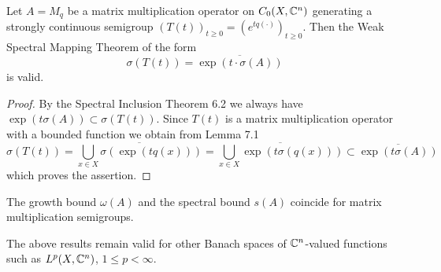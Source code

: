 \begin{theorem}\label{thm:a3-7.2}
Let $A = M_{q}$ be a matrix multiplication operator on $C_{0}(X,\mathbb{C}^{n})$ generating a strongly continuous semigroup $(T(t))_{t\geq 0} = (e^{tq(\cdot)})_{t\geq 0}$.
Then the Weak Spectral Mapping Theorem of the form
\begin{equation}\label{eq:a3-7.3}
\sigma(T(t)) = \overline{\exp(t\cdot\sigma(A))}
\end{equation}
is valid.
\end{theorem}
\begin{proof}
By the Spectral Inclusion Theorem 6.2 we always have $\exp(t\sigma(A)) \subset \sigma(T(t))$.
Since $T(t)$ is a matrix multiplication operator with a bounded function we obtain from Lemma 7.1
\[
\sigma(T(t)) = \overline{\bigcup_{x\in X} \sigma(\exp(tq(x)))} = \overline{\bigcup_{x\in X} \exp(t\sigma(q(x)))} \subset \overline{\exp(t\sigma(A))}
\]
which proves the assertion.
\end{proof}
\begin{corollary}\label{cor:a3-7.3}
The growth bound $\omega(A)$ and the spectral bound $s(A)$ coincide for matrix multiplication semigroups.
\end{corollary}
The above results remain valid for other Banach spaces of $\mathbb{C}^{n}$-valued functions such as $L^{p}(X,\mathbb{C}^{n})$, $1 \leq p < \infty$.

